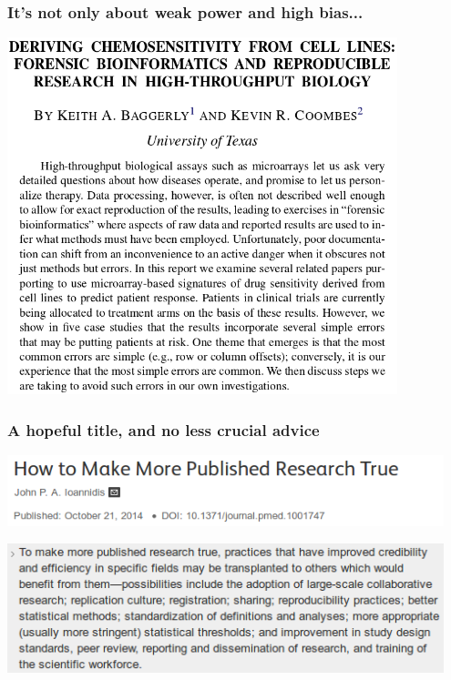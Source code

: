 \documentclass[c]{beamer} %
\begin{document}
\begin{frame}
  \frametitle{It's not only about weak power and high bias...}
  \begin{center}
    \includegraphics[width=0.85\textwidth,height=0.80\textheight,keepaspectratio=true]{baggerly_09_forensic-bioinfo_title-abstract}%
  \end{center}
\end{frame}

\begin{frame}
  \frametitle{A hopeful title, and no less crucial advice}
  \begin{center}
    \includegraphics[width=0.95\textwidth,height=0.90\textheight,keepaspectratio=true]{2014-10_JIoannidis_title}%
  \end{center}
  
  \bigskip
  
  \begin{center}
    \includegraphics[width=0.95\textwidth,height=0.90\textheight,keepaspectratio=true]{2014-10_JIoannidis_summary-point}%
  \end{center}
\end{frame}
\end{document}
